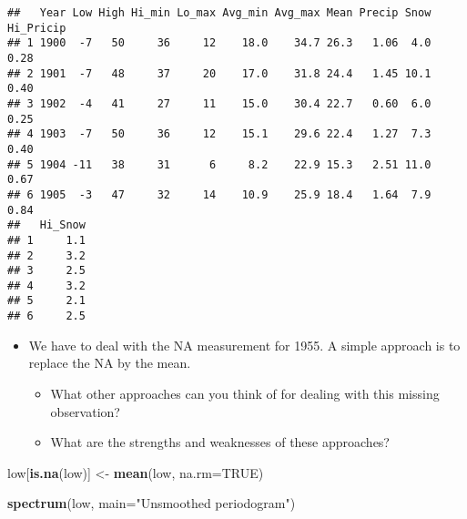 \documentclass[]{article}
\newenvironment{Shaded}{\begin{snugshade}}{\end{snugshade}}
\newcommand{\KeywordTok}[1]{\textcolor[rgb]{0.13,0.29,0.53}{\textbf{#1}}}
\newcommand{\DataTypeTok}[1]{\textcolor[rgb]{0.13,0.29,0.53}{#1}}
\newcommand{\StringTok}[1]{\textcolor[rgb]{0.31,0.60,0.02}{#1}}
\newcommand{\OtherTok}[1]{\textcolor[rgb]{0.56,0.35,0.01}{#1}}
\newcommand{\OperatorTok}[1]{\textcolor[rgb]{0.81,0.36,0.00}{\textbf{#1}}}
\newcommand{\NormalTok}[1]{#1}
\begin{document}
\begin{verbatim}
##   Year Low High Hi_min Lo_max Avg_min Avg_max Mean Precip Snow Hi_Pricip
## 1 1900  -7   50     36     12    18.0    34.7 26.3   1.06  4.0      0.28
## 2 1901  -7   48     37     20    17.0    31.8 24.4   1.45 10.1      0.40
## 3 1902  -4   41     27     11    15.0    30.4 22.7   0.60  6.0      0.25
## 4 1903  -7   50     36     12    15.1    29.6 22.4   1.27  7.3      0.40
## 5 1904 -11   38     31      6     8.2    22.9 15.3   2.51 11.0      0.67
## 6 1905  -3   47     32     14    10.9    25.9 18.4   1.64  7.9      0.84
##   Hi_Snow
## 1     1.1
## 2     3.2
## 3     2.5
## 4     3.2
## 5     2.1
## 6     2.5
\end{verbatim}

\begin{Shaded}
\end{Shaded}

\begin{itemize}
\item
  We have to deal with the NA measurement for 1955. A simple approach is
  to replace the NA by the mean.

  \begin{itemize}
  \item
    What other approaches can you think of for dealing with this missing
    observation?
  \item
    What are the strengths and weaknesses of these approaches?
  \end{itemize}
\end{itemize}

\begin{Shaded}
\begin{Highlighting}[]
\NormalTok{low[}\KeywordTok{is.na}\NormalTok{(low)] <-}\StringTok{ }\KeywordTok{mean}\NormalTok{(low, }\DataTypeTok{na.rm=}\OtherTok{TRUE}\NormalTok{)}
\end{Highlighting}
\end{Shaded}

\begin{Shaded}
\begin{Highlighting}[]
\KeywordTok{spectrum}\NormalTok{(low, }\DataTypeTok{main=}\StringTok{"Unsmoothed periodogram"}\NormalTok{)}
\end{Highlighting}
\end{Shaded}
\end{document}
